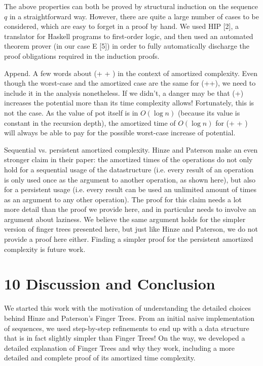 \documentclass[10pt]{article}
\begin{document}
The above properties can both be proved by structural induction on the sequence $q$ in a straightforward way. However, there are quite a large number of cases to be considered, which are easy to forget in a proof by hand. We used HIP [2], a translator for Haskell programs to first-order logic, and then used an automated theorem prover (in our case E [5]) in order to fully automatically discharge the proof obligations required in the induction proofs.

Append. A few words about (+ + ) in the context of amortized complexity. Even though the worst-case and the amortized case are the same for (++), we need to include it in the analysis nonetheless. If we didn't, a danger may be that (+) increases the potential more than its time complexity allows! Fortunately, this is not the case. As the value of pot itself is in $O(\log n)$ (because its value is constant in the recursion depth), the amortized time of $O(\log n)$ for (+ + ) will always be able to pay for the possible worst-case increase of potential.

Sequential vs. persistent amortized complexity. Hinze and Paterson make an even stronger claim in their paper: the amortized times of the operations do not only hold for a sequential usage of the datastructure (i.e. every result of an operation is only used once as the argument to another operation, as shown here), but also for a persistent usage (i.e. every result can be used an unlimited amount of times as an argument to any other operation). The proof for this claim needs a lot more detail than the proof we provide here, and in particular needs to involve an argument about laziness. We believe the same argument holds for the simpler version of finger trees presented here, but just like Hinze and Paterson, we do not provide a proof here either. Finding a simpler proof for the persistent amortized complexity is future work.

\section*{10 Discussion and Conclusion}
We started this work with the motivation of understanding the detailed choices behind Hinze and Paterson's Finger Trees. From an initial naive implementation of sequences, we used step-by-step refinements to end up with a data structure that is in fact slightly simpler than Finger Trees! On the way, we developed a detailed explanation of Finger Trees and why they work, including a more detailed and complete proof of its amortized time complexity.
\end{document}
